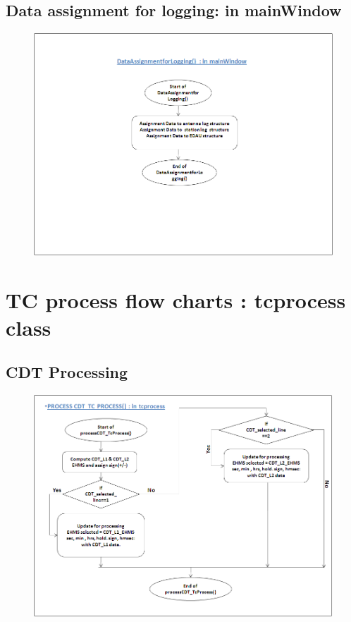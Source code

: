 \subsection{Data assignment for logging: in mainWindow}
\begin{figure}[H]
	\centering
	\includegraphics[width=\linewidth]{./FlowCharts/PngFlowCharts/TCP11.png}
\end{figure}
\section{TC process flow charts : tcprocess class}
\subsection{CDT Processing}
\begin{figure}[H]
	\centering
	\includegraphics[width=\linewidth]{./FlowCharts/PngFlowCharts/TCP4.png}
\end{figure}
